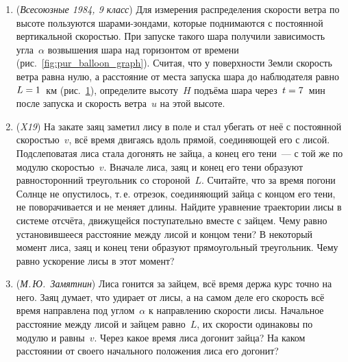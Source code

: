 \documentclass[../main.tex]{subfiles}
\begin{document}
\begin{enumerate}[wide=0pt]
  \begin{figure}[h]
    \sbox{\purboxA}{}%
    \sbox{\purboxB}{}%
    \hspace*{\fill}%
    \begin{minipage}[t]{\wd\purboxA}\centering
      \usebox{\purboxA}%
      \caption{}\label{fig:pur_tigers}%
    \end{minipage}%
    \hspace*{\fill}%
    \begin{minipage}[t]{\wd\purboxB}\centering
      \usebox{\purboxB}%
      \caption{}\label{fig:pur_balloon}%
    \end{minipage}%
    \hspace*{\fill}
  \end{figure}

  \item (\textit{Всесоюзные 1984, 9 класс}) Для измерения распределения скорости ветра по
  высоте пользуются шарами-зондами, которые поднимаются с постоянной вертикальной
  скоростью. При запуске такого шара получили зависимость угла~$\alpha$ возвышения шара
  над горизонтом от времени (рис.~\ref{fig:pur_balloon_graph}). Считая, что у
  поверхности Земли скорость ветра равна нулю, а расстояние от места запуска шара до
  наблюдателя равно~$L \hm= 1$~км (рис.~\ref{fig:pur_balloon}), определите высоту~$H$
  подъёма шара через~$t \hm= 7$~мин после запуска и скорость ветра~$u$ на этой высоте.


  \item (\textit{X19}) На закате заяц заметил лису в поле и стал убегать от неё с
  постоянной скоростью~$v$, всё время двигаясь вдоль прямой, соединяющей его с лисой. Подслеповатая лиса стала
  догонять не зайца, а конец его тени~--- с той же по модулю скоростью~$v$. Вначале
  лиса, заяц и конец его тени образуют равносторонний треугольник со стороной~$L$.
  Считайте, что за время погони Солнце не опустилось, т.\,е. отрезок, соединяющий
  зайца с концом его тени, не поворачивается и не меняет длины. Найдите уравнение
  траектории лисы в системе отсчёта, движущейся поступательно вместе с зайцем. Чему
  равно установившееся расстояние между лисой и концом тени? В некоторый момент лиса,
  заяц и конец тени образуют прямоугольный треугольник. Чему равно ускорение лисы в
  этот момент?

  \item (\textit{М.\,Ю.~Замятнин}) Лиса гонится за зайцем, всё время держа курс точно
  на него. Заяц думает, что удирает от лисы, а на самом деле его скорость всё время
  направлена под углом~$\alpha$ к направлению скорости лисы. Начальное расстояние
  между лисой и зайцем равно~$L$, их скорости одинаковы по модулю и равны~$v$. Через
  какое время лиса догонит зайца? На каком расстоянии от своего начального положения
  лиса его догонит?


\end{enumerate}
\end{document}

